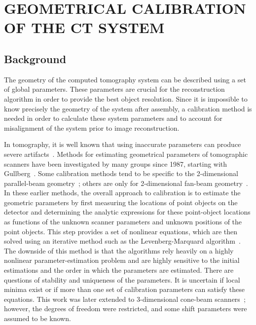 \chapter{GEOMETRICAL CALIBRATION OF THE CT SYSTEM}
\label{chap:calibration}

\section{Background}
The geometry of the computed tomography system can be described using a set of global parameters.  These parameters are crucial for the reconstruction algorithm in order to provide the best object resolution.  Since it is impossible to know precisely the geometry of the system after assembly, a calibration method is needed in order to calculate these system parameters and to account for misalignment of the system prior to image reconstruction.  

In tomography, it is well known that using inaccurate parameters can produce severe artifacts~\citep{Li1994a, Li1994b, Wang1998}. Methods for estimating geometrical parameters of tomographic scanners have been investigated by many groups since 1987, starting with Gullberg~\citep{Gullberg1987}.  Some calibration methods tend to be specific to the 2-dimensional parallel-beam geometry~\citep{Azevedo1990, Busemann1987}; others are only for 2-dimensional fan-beam geometry~\citep{Crawford1988, Hsieh1999, Gullberg1987}.  In these earlier methods, the overall approach to calibration is to estimate the geometric parameters by first measuring the locations of point objects on the detector and determining the analytic expressions for these point-object locations as functions of the unknown scanner parameters and unknown positions of the point objects.  This step provides a set of nonlinear equations, which are then solved using an iterative method such as the Levenberg-Marquard algorithm~\citep{Rougee1993}.  The downside of this method is that the algorithms rely heavily on a highly nonlinear parameter-estimation problem and are highly sensitive to the initial estimations and the order in which the parameters are estimated.  There are questions of stability and uniqueness of the parameters.  It is uncertain if local minima exist or if more than one set of calibration parameters can satisfy these equations.  This work was later extended to 3-dimensional cone-beam scanners~\citep{Gullberg1990}; however, the degrees of freedom were restricted, and some shift parameters were assumed to be known.


